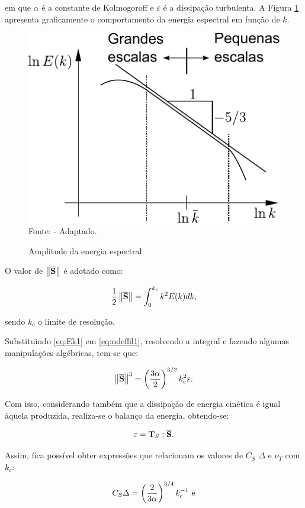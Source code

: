 \noindent em que $\alpha$ é a constante de Kolmogoroff e $\varepsilon$ é a dissipação turbulenta. A Figura \ref{fig:EnergiaEspectral} apresenta graficamente o comportamento da energia espectral em função de $k$.

\begin{figure}[h!]
    \centering
    \caption{Amplitude da energia espectral.}
    \includegraphics[width=0.4\linewidth]{Figuras/EnergiaEspectral.pdf}
    \\Fonte: \cite{hughes2000large} - Adaptado.
    \label{fig:EnergiaEspectral}
\end{figure}

O valor de $\left\lVert{\overline{\mathbf{S}}}\right\lVert$ é adotado como:

\begin{equation}
    \frac{1}{2}\left\lVert{\overline{\mathbf{S}}}\right\lVert=\int_0^{k_c}{k^2E(k)dk}\text{,}\label{eq:ndeffil1}
\end{equation}

\noindent sendo $k_c$ o limite de resolução.

Substituindo \eqref{eq:Ek1} em \eqref{eq:ndeffil1}, resolvendo a integral e fazendo algumas manipulações algébricas, tem-se que:

\begin{equation}
    \left\lVert{\overline{\mathbf{S}}}\right\lVert^3=\left({\frac{3\alpha}{2}}\right)^{3/2}k_c^2\varepsilon\text{.}
\end{equation}

Com isso, considerando também que a dissipação de energia cinética é igual àquela produzida, realiza-se o balanço da energia, obtendo-se:

\begin{equation}
    \varepsilon=\mathbf{T}_S:\overline{\mathbf{S}}\text{.}
\end{equation}

\noindent Assim, fica possível obter expressões que relacionam os valores de $C_S$ $\Delta$ e $\nu_T$ com $k_c$:

\begin{equation}
    C_S\Delta=\left({\frac{2}{3\alpha}}\right)^{3/4}k_c^{-1}\text{ e}
\end{equation}


